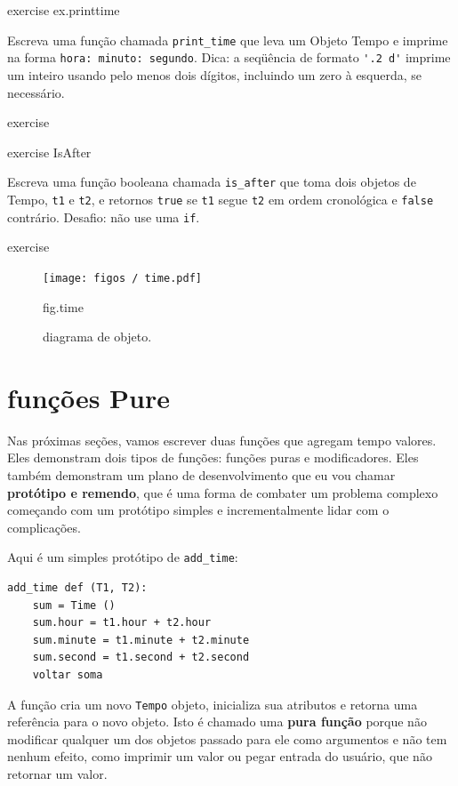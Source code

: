 \documentclass[10pt]{book}
\begin{document}
\begin{exercise}
\begin{v erbatim}
\begin{} exercise
\label{} ex.printtime

Escreva uma função chamada \verb "print_time" que leva um 
Objeto Tempo e imprime na forma {\tt hora: minuto: segundo}.
Dica: a seqüência de formato \verb "'.2 d'" imprime um inteiro usando
pelo menos dois dígitos, incluindo um zero à esquerda, se necessário.

\end{} exercise

\begin{} exercise
\label{} IsAfter

Escreva uma função booleana chamada \verb "is_after" que
toma dois objetos de Tempo, {\tt t1} e {\tt t2}, e
retornos {\tt true} se {\tt t1} segue {\tt t2} em ordem cronológica e
{\tt false} contrário. Desafio: não use uma {\tt if}.
\end{} exercise

\begin{figure}
\centerline
{\texttt{[image: figos / time.pdf]}}
\caption{diagrama de objeto.}
\label{} fig.time
\end{figure}


\section{funções Pure}

Nas próximas seções, vamos escrever duas funções que agregam tempo
valores. Eles demonstram dois tipos de funções: funções puras e
modificadores. Eles também demonstram um plano de desenvolvimento que eu vou chamar {\bf
  protótipo e remendo}, que é uma forma de combater um problema complexo
começando com um protótipo simples e incrementalmente lidar com o
complicações.

Aqui é um simples protótipo de \verb "add_time":

\begin{verbatim}
add_time def (T1, T2):
    sum = Time ()
    sum.hour = t1.hour + t2.hour
    sum.minute = t1.minute + t2.minute
    sum.second = t1.second + t2.second
    voltar soma
\end{verbatim}
%
A função cria um novo {\tt Tempo} objeto, inicializa sua
atributos e retorna uma referência para o novo objeto. Isto é chamado
uma {\bf pura função} porque não modificar qualquer um dos objetos
passado para ele como argumentos e não tem nenhum efeito,
como imprimir um valor ou pegar entrada do usuário, 
que não retornar um valor.


\end{v erbatim}
\end{exercise}
\end{document}
